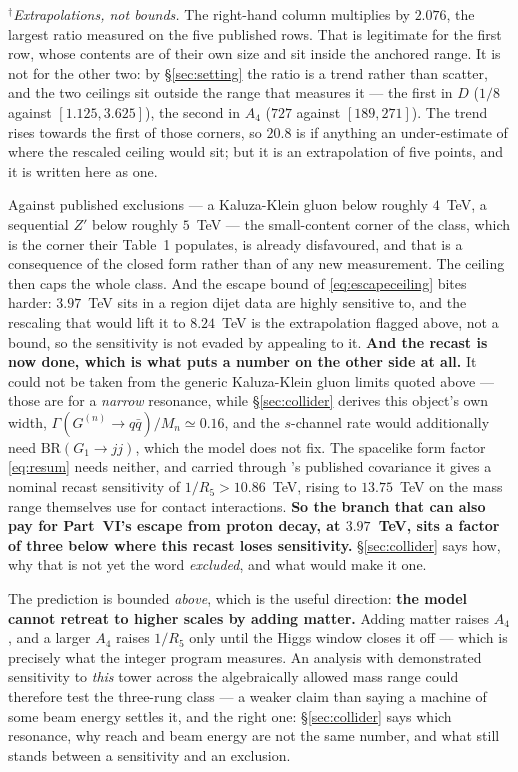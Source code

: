 \documentclass[11pt,a4paper]{article}
\newenvironment{keyeq}
  {\begin{center}\setlength{\fboxsep}{9pt}\setlength{\fboxrule}{0.8pt}%
   \begin{lrbox}{\keyeqbox}\begin{minipage}{0.88\textwidth}}
  {\end{minipage}\end{lrbox}%
   \fcolorbox{hdrblue!55}{hdrblue!6}{\usebox{\keyeqbox}}\end{center}}
\begin{document}
\noindent$^{\dagger}$\emph{Extrapolations, not bounds.} The right-hand column multiplies by $2.076$,
the largest ratio measured on the five published rows. That is legitimate for the first row, whose
contents are of their own size and sit inside the anchored range. It is not for the other two: by
\S\ref{sec:setting} the ratio is a trend rather than scatter, and the two ceilings sit outside the
range that measures it --- the first in $D$ ($1/8$ against $[1.125,3.625]$), the second in $A_4$
($727$ against $[189,271]$). The trend rises towards the first of those corners, so $20.8$ is if
anything an under-estimate of where the rescaled ceiling would sit; but it is an extrapolation of
five points, and it is written here as one.

\noindent Against published exclusions --- a Kaluza-Klein gluon below roughly $4$~TeV, a sequential
$Z'$ below roughly $5$~TeV --- the small-content corner of the class, which is the corner their
Table~1 populates, is already disfavoured, and that is a consequence of the closed form rather than
of any new measurement. The ceiling then caps the whole class. And the escape bound of
\eqref{eq:escapeceiling} bites harder: $3.97$~TeV sits in a region dijet data are highly sensitive
to, and the rescaling that would lift it to $8.24$~TeV is the extrapolation flagged above, not a
bound, so the sensitivity is not evaded by appealing to it. \textbf{And the recast is now done,
which is what puts a number on the other side at all.} It could not be taken from the generic Kaluza-Klein gluon limits
quoted above --- those are for a \emph{narrow} resonance, while \S\ref{sec:collider} derives this
object's own width, $\Gamma(G^{(n)}\!\to q\bar q)/M_n\simeq0.16$, and the $s$-channel rate would
additionally need $\mathrm{BR}(G_1\to jj)$, which the model does not fix. The spacelike form
factor \eqref{eq:resum} needs neither, and carried through \cite{CMSangular}'s published
covariance it gives a nominal recast sensitivity of $1/R_5>10.86$~TeV, rising to $13.75$~TeV on
the mass range \cite{CMSangular} themselves use for contact interactions. \textbf{So the branch
that can also pay for Part~VI's escape from proton decay, at $3.97$~TeV, sits a factor of three
below where this recast loses sensitivity.} \S\ref{sec:collider} says how, why that is not yet
the word \emph{excluded}, and what would make it one.

\begin{keyeq}
The prediction is bounded \emph{above}, which is the useful direction: \textbf{the model cannot
retreat to higher scales by adding matter.} Adding matter raises $A_4$, and a larger $A_4$ raises
$1/R_5$ only until the Higgs window closes it off --- which is precisely what the integer program
measures. An analysis with demonstrated sensitivity to \emph{this} tower across the algebraically
allowed mass range could therefore test the three-rung class --- a weaker claim than saying a
machine of some beam energy settles it, and the right one: \S\ref{sec:collider} says which
resonance, why reach and beam energy are not the same number, and what still stands between a
sensitivity and an exclusion.
\end{keyeq}
\end{document}
